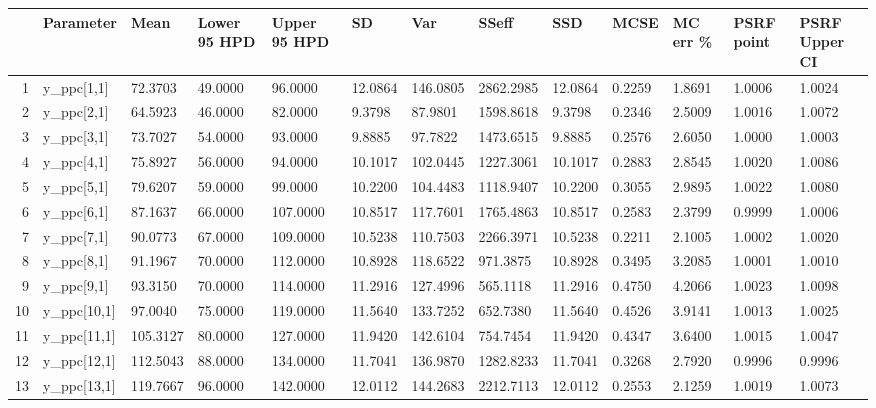 \begin{table}[ht]
\centering
\begin{tabular}{rllllllllllll}
  \hline
 & Parameter & Mean & Lower 95 HPD & Upper 95 HPD & SD & Var & SSeff & SSD & MCSE & MC err \% & PSRF point & PSRF Upper CI \\ 
  \hline
1 & y\_ppc[1,1] &  72.3703 &  49.0000 &  96.0000 & 12.0864 & 146.0805 & 2862.2985 & 12.0864 & 0.2259 & 1.8691 & 1.0006 & 1.0024 \\ 
  2 & y\_ppc[2,1] &  64.5923 &  46.0000 &  82.0000 &  9.3798 &  87.9801 & 1598.8618 &  9.3798 & 0.2346 & 2.5009 & 1.0016 & 1.0072 \\ 
  3 & y\_ppc[3,1] &  73.7027 &  54.0000 &  93.0000 &  9.8885 &  97.7822 & 1473.6515 &  9.8885 & 0.2576 & 2.6050 & 1.0000 & 1.0003 \\ 
  4 & y\_ppc[4,1] &  75.8927 &  56.0000 &  94.0000 & 10.1017 & 102.0445 & 1227.3061 & 10.1017 & 0.2883 & 2.8545 & 1.0020 & 1.0086 \\ 
  5 & y\_ppc[5,1] &  79.6207 &  59.0000 &  99.0000 & 10.2200 & 104.4483 & 1118.9407 & 10.2200 & 0.3055 & 2.9895 & 1.0022 & 1.0080 \\ 
  6 & y\_ppc[6,1] &  87.1637 &  66.0000 & 107.0000 & 10.8517 & 117.7601 & 1765.4863 & 10.8517 & 0.2583 & 2.3799 & 0.9999 & 1.0006 \\ 
  7 & y\_ppc[7,1] &  90.0773 &  67.0000 & 109.0000 & 10.5238 & 110.7503 & 2266.3971 & 10.5238 & 0.2211 & 2.1005 & 1.0002 & 1.0020 \\ 
  8 & y\_ppc[8,1] &  91.1967 &  70.0000 & 112.0000 & 10.8928 & 118.6522 &  971.3875 & 10.8928 & 0.3495 & 3.2085 & 1.0001 & 1.0010 \\ 
  9 & y\_ppc[9,1] &  93.3150 &  70.0000 & 114.0000 & 11.2916 & 127.4996 &  565.1118 & 11.2916 & 0.4750 & 4.2066 & 1.0023 & 1.0098 \\ 
  10 & y\_ppc[10,1] &  97.0040 &  75.0000 & 119.0000 & 11.5640 & 133.7252 &  652.7380 & 11.5640 & 0.4526 & 3.9141 & 1.0013 & 1.0025 \\ 
  11 & y\_ppc[11,1] & 105.3127 &  80.0000 & 127.0000 & 11.9420 & 142.6104 &  754.7454 & 11.9420 & 0.4347 & 3.6400 & 1.0015 & 1.0047 \\ 
  12 & y\_ppc[12,1] & 112.5043 &  88.0000 & 134.0000 & 11.7041 & 136.9870 & 1282.8233 & 11.7041 & 0.3268 & 2.7920 & 0.9996 & 0.9996 \\ 
  13 & y\_ppc[13,1] & 119.7667 &  96.0000 & 142.0000 & 12.0112 & 144.2683 & 2212.7113 & 12.0112 & 0.2553 & 2.1259 & 1.0019 & 1.0073 \\ 

\end{tabular}
\end{table}
